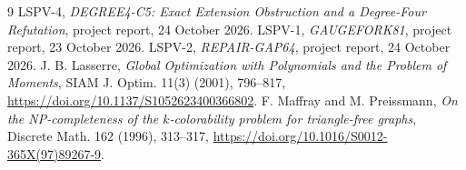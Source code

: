 \documentclass[11pt]{article}
\begin{document}
\begin{thebibliography}{9}
 LSPV-4, \emph{DEGREE4-C5: Exact Extension Obstruction and a
Degree-Four Refutation}, project report, 24 October 2026.
 LSPV-1, \emph{GAUGEFORK81}, project report, 23 October 2026.
 LSPV-2, \emph{REPAIR-GAP64}, project report, 24 October 2026.
 J. B. Lasserre, \emph{Global Optimization with Polynomials
and the Problem of Moments}, SIAM J. Optim. 11(3) (2001), 796--817,
\url{https://doi.org/10.1137/S1052623400366802}.
 F. Maffray and M. Preissmann, \emph{On the NP-completeness of
the $k$-colorability problem for triangle-free graphs}, Discrete Math. 162
(1996), 313--317,
\url{https://doi.org/10.1016/S0012-365X(97)89267-9}.
\end{thebibliography}
\end{document}
